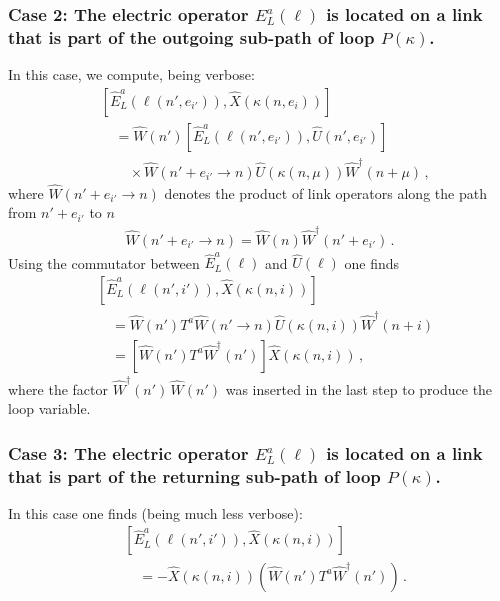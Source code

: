 \documentclass[reprint,superscriptaddress,pra,nofootinbib,preprintnumbers,floatfix]{revtex4-1}
\begin{document}
\subsubsection*{Case 2: The electric operator \texorpdfstring{$E_L^a(\ell)$}{Ea(l)} is located on a link that is part of the outgoing sub-path of loop \texorpdfstring{$P(\kappa)$}{P(kappa)}. }
In this case, we compute, being verbose:
\begin{align}
    & [\hat E_L^a (\ell(n',e_{i'})), \hat X(\kappa(n,e_i))] \\
 & \quad = \hat W(n')[\hat E_L^a (\ell(n',e_{i'})),\hat U(n',e_{i'})] \nonumber\\
 & \quad \quad \times \hat W(n'+e_{i'} \to n) \hat U(\kappa(n,\mu))\hat W^\dagger(n+\mu)
 \,,\nonumber
\end{align}
%
where $\hat W(n'+e_{i'} \to n)$ denotes the product of link operators along the path from $n'+e_{i'}$ to $n$
%
\begin{align}
    \hat W(n'+e_{i'} \to n) = \hat W(n) \hat W^\dagger(n'+e_{i'})
    \,.
\end{align}
%
Using the commutator between $\hat E_L^a(\ell)$ and $\hat U(\ell)$ one finds
%
\begin{align}\label{eq:case2}
    & [\hat E_L^a (\ell(n',i')), \hat X(\kappa(n,i))] \\
    & \quad =  \hat W(n')T^a \hat W(n' \to n) \hat U (\kappa(n,i))\hat W^\dagger(n+i) \nonumber\\
    & \quad = \left[ \hat W(n')T^a \hat W^\dagger(n') \right] \hat X(\kappa(n,i))
    \,,\nonumber
\end{align}
%
where the factor $\hat W^\dagger(n')\, \hat W(n')$ was inserted in the last step to produce the loop variable. 

\subsubsection*{Case 3: The electric operator \texorpdfstring{$E_L^a(\ell)$}{Ea(l)} is located on a link that is part of the returning sub-path of loop \texorpdfstring{$P(\kappa)$}{P(kappa)}. }
In this case one finds (being much less verbose):
\begin{align}
        & [\hat E_L^a (\ell(n',i')), \hat X(\kappa(n,i))] \\
    & \quad =  -\hat X(\kappa(n, i)) \left( \hat W(n')T^a \hat W^\dagger(n') \right)
    \,.\nonumber
\end{align}
\end{document}
